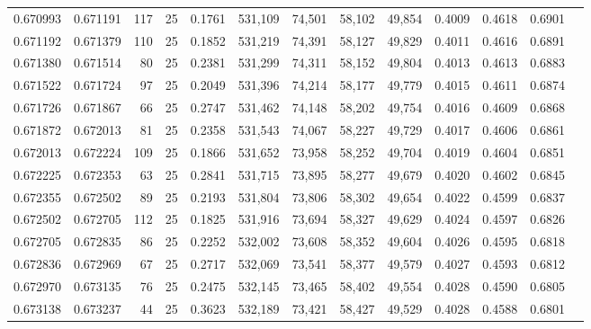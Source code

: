 \begin{tabular}{rrrrrrrrrrrrr}
0.670993 & 0.671191 &   117 &  25 &                                     0.1761 & 531,109 &  74,501 &  58,102 &  49,854 & 0.4009 & 0.4618 & 0.6901 \\
0.671192 & 0.671379 &   110 &  25 &                                     0.1852 & 531,219 &  74,391 &  58,127 &  49,829 & 0.4011 & 0.4616 & 0.6891 \\
0.671380 & 0.671514 &    80 &  25 &                                     0.2381 & 531,299 &  74,311 &  58,152 &  49,804 & 0.4013 & 0.4613 & 0.6883 \\
0.671522 & 0.671724 &    97 &  25 &                                     0.2049 & 531,396 &  74,214 &  58,177 &  49,779 & 0.4015 & 0.4611 & 0.6874 \\
0.671726 & 0.671867 &    66 &  25 &                                     0.2747 & 531,462 &  74,148 &  58,202 &  49,754 & 0.4016 & 0.4609 & 0.6868 \\
0.671872 & 0.672013 &    81 &  25 &                                     0.2358 & 531,543 &  74,067 &  58,227 &  49,729 & 0.4017 & 0.4606 & 0.6861 \\
0.672013 & 0.672224 &   109 &  25 &                                     0.1866 & 531,652 &  73,958 &  58,252 &  49,704 & 0.4019 & 0.4604 & 0.6851 \\
0.672225 & 0.672353 &    63 &  25 &                                     0.2841 & 531,715 &  73,895 &  58,277 &  49,679 & 0.4020 & 0.4602 & 0.6845 \\
0.672355 & 0.672502 &    89 &  25 &                                     0.2193 & 531,804 &  73,806 &  58,302 &  49,654 & 0.4022 & 0.4599 & 0.6837 \\
0.672502 & 0.672705 &   112 &  25 &                                     0.1825 & 531,916 &  73,694 &  58,327 &  49,629 & 0.4024 & 0.4597 & 0.6826 \\
0.672705 & 0.672835 &    86 &  25 &                                     0.2252 & 532,002 &  73,608 &  58,352 &  49,604 & 0.4026 & 0.4595 & 0.6818 \\
0.672836 & 0.672969 &    67 &  25 &                                     0.2717 & 532,069 &  73,541 &  58,377 &  49,579 & 0.4027 & 0.4593 & 0.6812 \\
0.672970 & 0.673135 &    76 &  25 &                                     0.2475 & 532,145 &  73,465 &  58,402 &  49,554 & 0.4028 & 0.4590 & 0.6805 \\
0.673138 & 0.673237 &    44 &  25 &                                     0.3623 & 532,189 &  73,421 &  58,427 &  49,529 & 0.4028 & 0.4588 & 0.6801 \\

\end{tabular}
